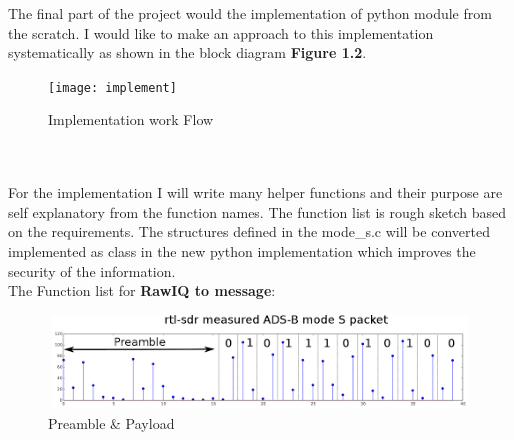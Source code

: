 \documentclass[11pt,a4paper]{report}
\begin{document}
The final part of the project would the implementation of python module from the scratch. I would like to make an approach to this implementation systematically as shown in the block diagram \textbf{Figure 1.2}.    
\begin{figure}[h]

\texttt{[image: implement]}
\caption{Implementation work Flow}
\end{figure}
\\
\\
For the implementation I will write many helper functions and their purpose are self explanatory from the function names. The function list is rough sketch based on the requirements. The structures defined in the mode\_s.c will be converted implemented as class in the new python implementation which improves the security of the information. \\
The Function list for \textbf{RawIQ to message}:
\begin{figure}[h]
\centering
\includegraphics[width=12cm,height=2.5cm]{images}
\caption{Preamble \& Payload}
\end{figure}
\end{document}
